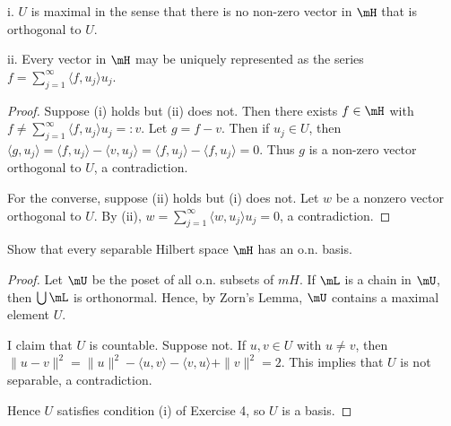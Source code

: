 \documentclass{article}
\begin{document}
i. $U$ is maximal in the sense that there is no non-zero vector in $\mH$ that is orthogonal to $U$.

ii. Every vector in $\mH$ may be uniquely represented as the series $f = \sum_{j=1}^\infty \langle f , u_j \rangle u_j$.

\begin{proof}
Suppose (i) holds but (ii) does not.  Then there exists $f \in \mH$ with $f \neq \sum_{j=1}^\infty \langle f , u_j \rangle u_j =: v$.  Let $g = f - v$.  Then if $u_j \in U$, then $\langle g, u_j \rangle = \langle f, u_j \rangle - \langle v, u_j \rangle = \langle f, u_j \rangle - \langle f, u_j \rangle = 0$. Thus $g$ is a non-zero vector orthogonal to $U$, a contradiction.

For the converse, suppose (ii) holds but (i) does not. Let $w$ be a nonzero vector orthogonal to $U$.  By (ii), $w = \sum_{j=1}^\infty \langle w, u_j \rangle u_j = 0$, a contradiction.
\end{proof}

 Show that every separable Hilbert space $\mH$ has an o.n. basis.
\begin{proof}
Let $\mU$ be the poset of all o.n. subsets of $mH$.  If $\mL$ is a chain in $\mU$, then $\bigcup \mL$ is orthonormal.  Hence, by Zorn's Lemma, $\mU$ contains a maximal element $U$. 

I claim that $U$ is countable.  Suppose not. If $u,v \in U$ with $u \neq v$, then $\|u - v\|^2 = \|u\|^2 - \langle u, v \rangle - \langle v, u \rangle + \|v\|^2 = 2$.  This implies that $U$ is not separable, a contradiction.

Hence $U$ satisfies condition (i) of Exercise 4, so $U$ is a basis.
\end{proof}
\end{document}
